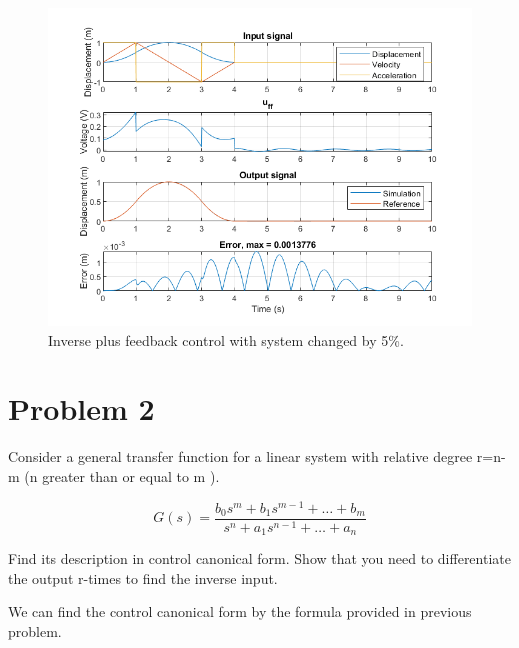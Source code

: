 \documentclass[12pt]{article}
\begin{document}
\begin{enumerate}[(a)]
    \begin{figure}[h]
      \includegraphics{p5_error_ff_fb.png}
      \centering
      \caption{Inverse plus feedback control with system changed by 5\%.}
    \end{figure}

  \end{enumerate}

  \clearpage

  \section{Problem 2}
  Consider a general transfer function for a linear system with relative degree r=n-m (n greater than or equal to m ).

  \begin{equation}
    G(s) = \frac{b_0 s^m + b_1 s^{m-1} + \dots + b_m}{s^n + a_1 s^{n-1} + \dots + a_n}
  \end{equation}

  Find its description in control canonical form. Show that you need to differentiate the
  output r-times to find the inverse input.

  \hfill

  We can find the control canonical form by the formula provided in previous problem.
\end{document}
